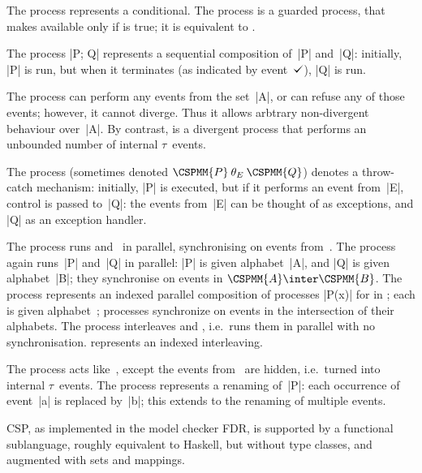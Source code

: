 The process  represents a conditional. 
The process  is a guarded process, that makes  available
only if  is true; it is equivalent to .

The process |P; Q| represents a sequential composition of~|P| and~|Q|:
initially, |P| is run, but when it terminates (as indicated by event~$\tick$),
|Q| is run. 

The process  can perform any events from the set~|A|, or can
refuse any of those events; however, it cannot diverge.  Thus it allows
arbtrary non-divergent behaviour over~|A|.  By contrast,  is a
divergent process that performs an unbounded number of internal $\tau$~events.

The process \CSPM{P [|E|> Q} 
(sometimes denoted $\CSPMM{P} \mathbin{\theta_E} \CSPMM{Q}$) denotes a
  throw-catch mechanism: initially, |P| is executed, but if it performs an
  event from~|E|, control is passed to~|Q|: the events from~|E| can be thought
  of as exceptions, and |Q| as an exception handler.

The process  runs  and~ in parallel,
synchronising on events from~.  The process  again
runs~|P| and~|Q| in parallel: |P| is given alphabet~|A|, and |Q| is given
alphabet~|B|; they synchronise on events in $\CSPMM{A} \inter \CSPMM{B}$.
%
The process  represents an indexed parallel composition of processes |P(x)| for
 in ; each  is given alphabet~;
processes synchronize on events in the intersection of their alphabets.
The process  interleaves  and , i.e.\ runs them
in parallel with no synchronisation.   represents an
indexed interleaving.

The process  acts like~, except the events from~
are hidden, i.e.~turned into internal $\tau$~events.  
%
The process  represents a renaming of~|P|: each occurrence of
event~|a| is replaced by~|b|; this extends to the renaming of multiple
events. 

CSP, as implemented in the model checker FDR, is supported by a functional
sublanguage, roughly equivalent to Haskell, but without type classes, and
augmented with sets and mappings. 
 
